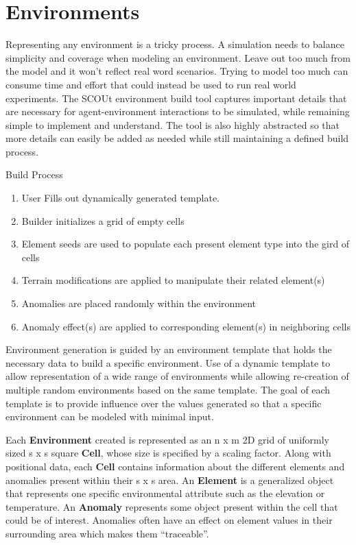 \documentclass[]{report}
\begin{document}
\section{Environments}
Representing any environment is a tricky process.
A simulation needs to balance simplicity and coverage when modeling an environment.
Leave out too much from the model and it won’t reflect real word scenarios.
Trying to model too much can consume time and effort that could instead be used to run real world experiments.
The SCOUt environment build tool captures important details that are necessary for agent-environment interactions to be simulated, while remaining simple to implement and understand.
The tool is also highly abstracted so that more details can easily be added as needed while still maintaining a defined build process.

Build Process
\begin{enumerate}
  \item User Fills out dynamically generated template. 
  \item	Builder initializes a grid of empty cells
  \item	Element seeds are used to populate each present element type into the gird of cells
  \item	Terrain modifications are applied to manipulate their related element(s)
  \item	Anomalies are placed randomly within the environment
  \item	Anomaly effect(s) are applied to corresponding element(s) in neighboring cells
\end{enumerate}

Environment generation is guided by an environment template that holds the necessary data to build a specific environment. 
Use of a dynamic template to allow representation of a wide range of environments while allowing re-creation of multiple random environments based on the same template.
The goal of each template is to provide influence over the values generated so that a specific environment can be modeled with minimal input.

Each \textbf{Environment} created is represented as an n x m 2D grid of uniformly sized s x s square \textbf{Cell}, whose size is specified by a scaling factor.
Along with positional data, each \textbf{Cell} contains information about the different elements and anomalies present within their s x s area.
An \textbf{Element} is a generalized object that represents one specific environmental attribute such as the elevation or temperature.
An \textbf{Anomaly} represents some object present within the cell that could be of interest.
Anomalies often have an effect on element values in their surrounding area which makes them “traceable”.
\end{document}
